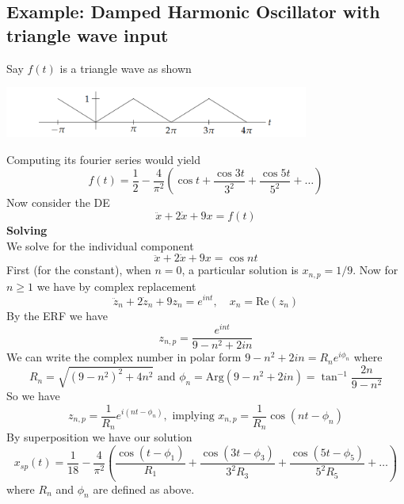 \documentclass{report}
\begin{document}
\subsection{Example: Damped Harmonic Oscillator with\\triangle wave input}
Say $f(t)$ is a triangle wave as shown
\begin{center}
\includegraphics[width=10cm]{40}\\
\end{center}
Computing its fourier series would yield
\begin{equation*}
f(t)=\frac{1}{2}-\frac{4}{\pi^2}\left(\cos t+\frac{\cos3t}{3^2}+\frac{\cos5t}{5^2}+\ldots\right)
\end{equation*}
Now consider the DE
\begin{equation*}
\ddot{x}+2\dot{x}+9x=f(t)
\end{equation*}
\textbf{Solving}\\
We solve for the individual component
\begin{equation*}
\ddot{x}+2\dot{x}+9x=\cos nt
\end{equation*}
First (for the constant), when $n=0$, a particular solution is $x_{n,p}=1/9$. Now for $n\geq1$ we have by complex
replacement
\begin{equation*}
\ddot{z}_n+2\dot{z}_n+9z_n=e^{int},\quad x_n=\text{Re}(z_n)
\end{equation*}
By the ERF we have
\begin{equation*}
z_{n,p}=\frac{e^{int}}{9-n^2+2in}
\end{equation*}
We can write the complex number in polar form $9-n^2+2in=R_ne^{i\phi_n}$ where
\begin{equation*}
R_n=\sqrt{(9-n^2)^2+4n^2}\text{ and }\phi_n=\text{Arg}(9-n^2+2in)=\tan^{-1}\frac{2n}{9-n^2}
\end{equation*}
So we have
\begin{equation*}
z_{n,p}=\frac{1}{R_n}e^{i(nt-\phi_n)},\text{ implying }x_{n,p}=\frac{1}{R_n}\cos(nt-\phi_n)
\end{equation*}
By superposition we have our solution
\begin{equation*}
x_{sp}(t)=\frac{1}{18}-\frac{4}{\pi^2}\left(\frac{\cos(t-\phi_1)}{R_1}+\frac{\cos(3t-\phi_3)}{3^2R_3}
+\frac{\cos(5t-\phi_5)}{5^2R_5}+\ldots\right)
\end{equation*}
where $R_n$ and $\phi_n$ are defined as above.
\newpage
\end{document}
